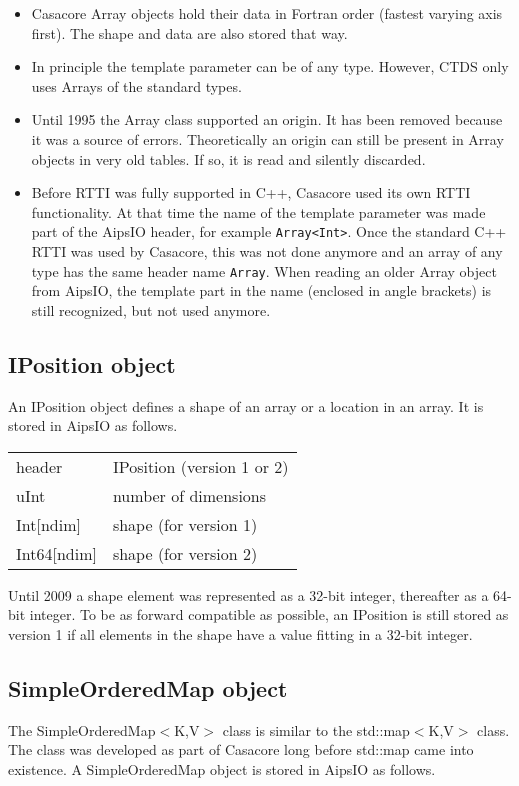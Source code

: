 \begin {itemize}
\item Casacore Array objects hold their data in Fortran order (fastest
  varying axis first). The shape and data are also stored that way.
\item In principle the template parameter can be of any
  type. However, CTDS only uses Arrays of the standard types.
\item Until 1995 the Array class supported an origin. It has been
  removed because it was a
  source of errors. Theoretically an origin can still be present in
  Array objects in very old tables. If so, it is read and silently discarded.
\item Before RTTI was fully supported in C++, Casacore used its
  own RTTI functionality. At that time the name of the template
  parameter was made part of the AipsIO header, for example
  \texttt{Array<Int>}. Once the standard C++ RTTI was used by Casacore, this was
  not done anymore and an array of any type has the same header name
  \texttt{Array}. When reading an older Array object from AipsIO, the
  template part in the name (enclosed in angle brackets) is still
  recognized, but not used anymore. 
\end {itemize}


\subsection{IPosition object}
An IPosition object defines a shape of an array or a location in an array.
It is stored in AipsIO as follows.

\vspace{0.15in}
\begin{tabular}{|l|p{13cm}|} \hline
  header & IPosition (version 1 or 2) \\
  uInt & number of dimensions \\
  Int[ndim] & shape (for version 1) \\
  Int64[ndim] & shape (for version 2) \\
  \hline
\end{tabular}
\vspace{0.15in}

Until 2009 a shape element was represented as a 32-bit integer,
thereafter as a 64-bit integer. To be as forward compatible as
possible, an IPosition is still stored as version 1 if all elements in
the shape have a value fitting in a 32-bit integer.


\subsection{\label{CTDS:SIMORDMAP}SimpleOrderedMap object}
The SimpleOrderedMap$<$K,V$>$ class is similar to the std::map$<$K,V$>$ class.
The class was developed as part of Casacore long before std::map came
into existence.
A SimpleOrderedMap object is stored in AipsIO as follows.

